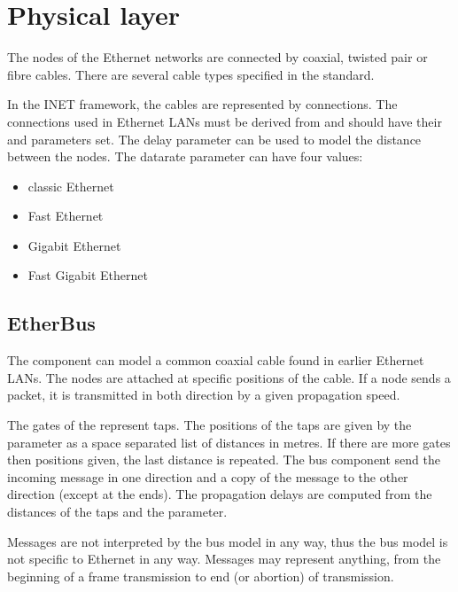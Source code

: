 \section{Physical layer}

The nodes of the Ethernet networks are connected by coaxial,
twisted pair or fibre cables. There are several cable types specified
in the standard.

In the INET framework, the cables are represented by connections.
The connections used in Ethernet LANs must be derived from
 and should have their  and
 parameters set.
The delay parameter can be used to model the distance between the
nodes. The datarate parameter can have four values:

\begin{itemize}
  \item {} classic Ethernet
  \item {} Fast Ethernet
  \item {} Gigabit Ethernet
  \item {} Fast Gigabit Ethernet
\end{itemize}


\subsection{EtherBus}

The  component can model a common coaxial cable
found in earlier Ethernet LANs. The nodes are attached at specific
positions of the cable. If a node sends a packet, it is transmitted
in both direction by a given propagation speed.

The gates of the  represent taps. The positions
of the taps are given by the  parameter as a
space separated list of distances in metres. If there are more
gates then positions given, the last distance is repeated.
The bus component send the incoming message in one direction and
a copy of the message to the other direction (except at the ends).
The propagation delays are computed from the distances of the taps
and the  parameter.

Messages are not interpreted by the bus model in any way, thus the bus
model is not specific to Ethernet in any way. Messages may
represent anything, from the beginning of a frame transmission to
end (or abortion) of transmission.



